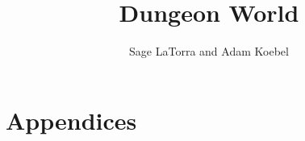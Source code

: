 \documentclass[11pt,twoside,twocolumn,openany]{memoir}
\title{Dungeon World}
\author{Sage LaTorra and Adam Koebel}
\date{}
\begin{document}
\maketitle
\tableofcontents






%


























\chapter{Appendices}
%




\printindex
\end{document}
